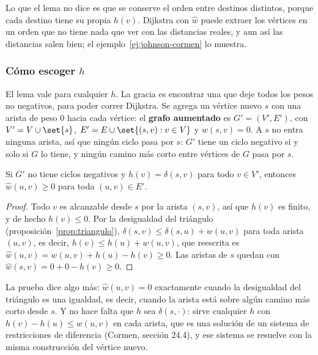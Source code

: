 \documentclass[11pt,letterpaper]{article}
\begin{document}
Lo que el lema no dice es que se conserve el orden entre destinos
distintos, porque cada destino tiene su propia $h(v)$. Dijkstra con
$\hat{w}$ puede extraer los vértices en un orden que no tiene nada que
ver con las distancias reales, y aun así las distancias salen bien; el
ejemplo~\ref{ej:johnson-cormen} lo muestra.

\subsubsection*{Cómo escoger $h$}

El lema vale para cualquier $h$. La gracia es encontrar una que deje
todos los pesos no negativos, para poder correr Dijkstra. Se agrega un
vértice nuevo $s$ con una arista de peso $0$ hacia cada vértice: el
\textbf{grafo aumentado} es $G' = (V', E')$, con $V' = V \cup \set{s}$,
$E' = E \cup \set{(s, v) : v \in V}$ y $w(s, v) = 0$. A $s$ no entra
ninguna arista, así que ningún ciclo pasa por $s$: $G'$ tiene un ciclo
negativo si y solo si $G$ lo tiene, y ningún camino más corto entre
vértices de $G$ pasa por $s$.

\begin{proposicion}
  \label{prop:johnson-no-negativos}
  Si $G'$ no tiene ciclos negativos y $h(v) = \delta(s, v)$ para todo
  $v \in V'$, entonces $\hat{w}(u, v) \ge 0$ para toda
  $(u, v) \in E'$.
\end{proposicion}

\begin{proof}
  Todo $v$ es alcanzable desde $s$ por la arista $(s, v)$, así que
  $h(v)$ es finito, y de hecho $h(v) \le 0$. Por la desigualdad del
  triángulo (proposición~\ref{prop:triangulo}),
  $\delta(s, v) \le \delta(s, u) + w(u, v)$ para toda arista $(u, v)$,
  es decir, $h(v) \le h(u) + w(u, v)$, que reescrita es
  $\hat{w}(u, v) = w(u, v) + h(u) - h(v) \ge 0$. Las aristas de $s$
  quedan con $\hat{w}(s, v) = 0 + 0 - h(v) \ge 0$.
\end{proof}

La prueba dice algo más: $\hat{w}(u, v) = 0$ exactamente cuando la
desigualdad del triángulo es una igualdad, es decir, cuando la arista
está sobre algún camino más corto desde $s$. Y no hace falta que $h$
sea $\delta(s, \cdot)$: sirve cualquier $h$ con
$h(v) - h(u) \le w(u, v)$ en cada arista, que es una solución de un
sistema de restricciones de diferencia (Cormen, sección 24.4), y ese
sistema se resuelve con la misma construcción del vértice nuevo.
\end{document}
